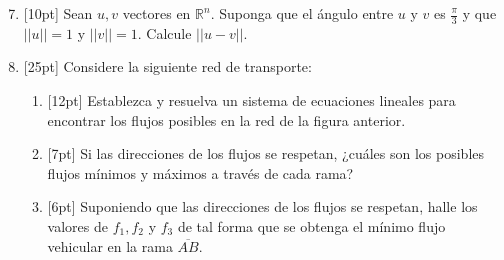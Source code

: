 \documentclass[11pt]{article}
\begin{document}
\begin{enumerate}
\setcounter{enumi}{6}
\item{}[10pt] Sean $u, v$ vectores en $\mathbb{R}^n$. Suponga que el ángulo entre $u$ y $v$ es $\frac{\pi}{3}$ y que $||u||=1$ y $||v||=1$. Calcule $||u-v||$.

\vspace{4cm}

\item{}[25pt] Considere la siguiente red de transporte:

\vspace{6pt}
\begin{center}
\end{center}

\begin{enumerate}
\item{}[12pt] Establezca y resuelva un sistema de ecuaciones lineales para encontrar los flujos posibles en la red de la figura anterior.

\vspace{5cm}

\item{}[7pt] Si las direcciones de los flujos se respetan, ¿cuáles son los posibles flujos mínimos y máximos a través de cada rama?

\vspace{4cm}

\item{}[6pt] Suponiendo que las direcciones de los flujos se respetan, halle los valores de $f_1, f_2$ y $f_3$ de tal forma que se obtenga el mínimo flujo vehicular en la rama $\overline{AB}$.
\end{enumerate}
\end{enumerate}

\examfooter
\end{document}
